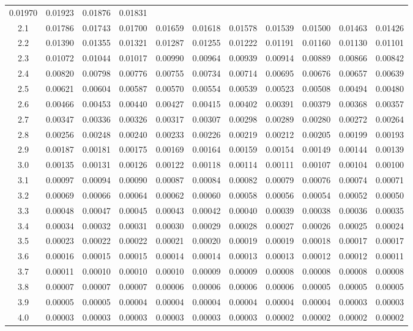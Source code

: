 \begin{longtable}[]{@{}ccccccccccc@{}}
0.01970 & 0.01923 & 0.01876 & 0.01831\tabularnewline
2.1 & 0.01786 & 0.01743 & 0.01700 & 0.01659 & 0.01618 & 0.01578 &
0.01539 & 0.01500 & 0.01463 & 0.01426\tabularnewline
2.2 & 0.01390 & 0.01355 & 0.01321 & 0.01287 & 0.01255 & 0.01222 &
0.01191 & 0.01160 & 0.01130 & 0.01101\tabularnewline
2.3 & 0.01072 & 0.01044 & 0.01017 & 0.00990 & 0.00964 & 0.00939 &
0.00914 & 0.00889 & 0.00866 & 0.00842\tabularnewline
2.4 & 0.00820 & 0.00798 & 0.00776 & 0.00755 & 0.00734 & 0.00714 &
0.00695 & 0.00676 & 0.00657 & 0.00639\tabularnewline
2.5 & 0.00621 & 0.00604 & 0.00587 & 0.00570 & 0.00554 & 0.00539 &
0.00523 & 0.00508 & 0.00494 & 0.00480\tabularnewline
2.6 & 0.00466 & 0.00453 & 0.00440 & 0.00427 & 0.00415 & 0.00402 &
0.00391 & 0.00379 & 0.00368 & 0.00357\tabularnewline
2.7 & 0.00347 & 0.00336 & 0.00326 & 0.00317 & 0.00307 & 0.00298 &
0.00289 & 0.00280 & 0.00272 & 0.00264\tabularnewline
2.8 & 0.00256 & 0.00248 & 0.00240 & 0.00233 & 0.00226 & 0.00219 &
0.00212 & 0.00205 & 0.00199 & 0.00193\tabularnewline
2.9 & 0.00187 & 0.00181 & 0.00175 & 0.00169 & 0.00164 & 0.00159 &
0.00154 & 0.00149 & 0.00144 & 0.00139\tabularnewline
3.0 & 0.00135 & 0.00131 & 0.00126 & 0.00122 & 0.00118 & 0.00114 &
0.00111 & 0.00107 & 0.00104 & 0.00100\tabularnewline
3.1 & 0.00097 & 0.00094 & 0.00090 & 0.00087 & 0.00084 & 0.00082 &
0.00079 & 0.00076 & 0.00074 & 0.00071\tabularnewline
3.2 & 0.00069 & 0.00066 & 0.00064 & 0.00062 & 0.00060 & 0.00058 &
0.00056 & 0.00054 & 0.00052 & 0.00050\tabularnewline
3.3 & 0.00048 & 0.00047 & 0.00045 & 0.00043 & 0.00042 & 0.00040 &
0.00039 & 0.00038 & 0.00036 & 0.00035\tabularnewline
3.4 & 0.00034 & 0.00032 & 0.00031 & 0.00030 & 0.00029 & 0.00028 &
0.00027 & 0.00026 & 0.00025 & 0.00024\tabularnewline
3.5 & 0.00023 & 0.00022 & 0.00022 & 0.00021 & 0.00020 & 0.00019 &
0.00019 & 0.00018 & 0.00017 & 0.00017\tabularnewline
3.6 & 0.00016 & 0.00015 & 0.00015 & 0.00014 & 0.00014 & 0.00013 &
0.00013 & 0.00012 & 0.00012 & 0.00011\tabularnewline
3.7 & 0.00011 & 0.00010 & 0.00010 & 0.00010 & 0.00009 & 0.00009 &
0.00008 & 0.00008 & 0.00008 & 0.00008\tabularnewline
3.8 & 0.00007 & 0.00007 & 0.00007 & 0.00006 & 0.00006 & 0.00006 &
0.00006 & 0.00005 & 0.00005 & 0.00005\tabularnewline
3.9 & 0.00005 & 0.00005 & 0.00004 & 0.00004 & 0.00004 & 0.00004 &
0.00004 & 0.00004 & 0.00003 & 0.00003\tabularnewline
4.0 & 0.00003 & 0.00003 & 0.00003 & 0.00003 & 0.00003 & 0.00003 &
0.00002 & 0.00002 & 0.00002 & 0.00002\tabularnewline
\bottomrule
\end{longtable}
